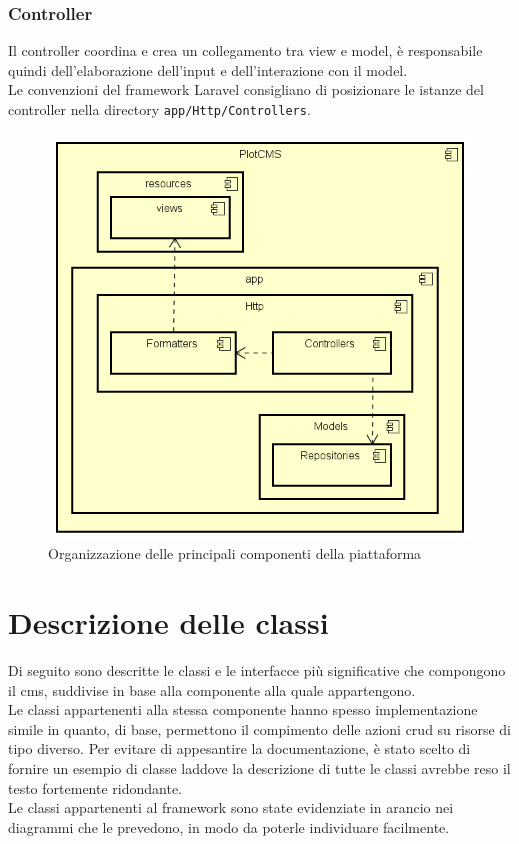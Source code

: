 
\subsubsection{Controller} %
Il controller coordina e crea un collegamento tra view e model, è responsabile quindi dell'elaborazione dell'input e dell'interazione con il model. \\
Le convenzioni del framework Laravel consigliano di posizionare le istanze del controller nella directory \verb!app/Http/Controllers!.

\begin{figure}
	\centering
  \includegraphics[scale=0.6]{immagini/components/important_components_diagram.png}
  \caption{Organizzazione delle principali componenti della piattaforma}
	\label{fig:components} 
\end{figure}

\section{Descrizione delle classi}
Di seguito sono descritte le classi e le interfacce più significative che compongono il \gls{cms}\glsfirstoccur{}, suddivise in base alla componente alla quale appartengono. \\
Le classi appartenenti alla stessa componente hanno spesso implementazione simile in quanto, di base, permettono il compimento delle azioni \gls{crud}\glsfirstoccur{} su risorse di tipo diverso. Per evitare di appesantire la documentazione, è stato scelto di fornire un esempio di classe laddove la descrizione di tutte le classi avrebbe reso il testo fortemente ridondante. \\
Le classi appartenenti al framework sono state evidenziate in arancio nei diagrammi che le prevedono, in modo da poterle individuare facilmente.


